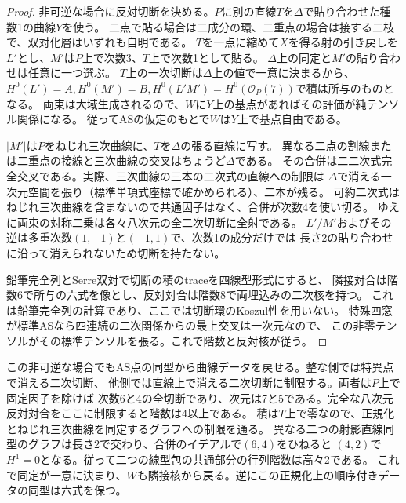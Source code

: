 \begin{proof}
非可逆な場合に反対切断を決める。$P$に別の直線$T$を$\Delta$で貼り合わせた種数1の曲線$Y$を使う。
二点で貼る場合は二成分の環、二重点の場合は接する二枝で、双対化層はいずれも自明である。
$T$を一点に縮めて$X$を得る射の引き戻しを$L'$とし、$M'$は$P$上で次数3、$T$上で次数1として貼る。
$\Delta$上の同定と$M'$の貼り合わせは任意に一つ選ぶ。
$T$上の一次切断は$\Delta$上の値で一意に決まるから、
$H^0(L')=A,H^0(M')=B,H^0(L'M')=H^0(\mathcal O_P(7))$で積は所与のものとなる。
両束は大域生成されるので、$W$に$Y$上の基点があればその評価が純テンソル関係になる。
従ってASの仮定のもとで$W$は$Y$上で基点自由である。

$|M'|$は$P$をねじれ三次曲線に、$T$を$\Delta$の張る直線に写す。
異なる二点の割線または二重点の接線と三次曲線の交叉はちょうど$\Delta$である。
その合併は二二次式完全交叉である。実際、三次曲線の三本の二次式の直線への制限は
$\Delta$で消える一次元空間を張り（標準単項式座標で確かめられる）、二本が残る。
可約二次式はねじれ三次曲線を含まないので共通因子はなく、合併が次数4を使い切る。
ゆえに両束の対称二乗は各々八次元の全二次切断に全射である。
$L'/M'$およびその逆は多重次数$(1,-1)$と$(-1,1)$で、次数1の成分だけでは
長さ2の貼り合わせに沿って消えられないため切断を持たない。

鉛筆完全列とSerre双対で切断の積のtraceを四線型形式にすると、
隣接対合は階数6で所与の六式を像とし、反対対合は階数8で両埋込みの二次核を持つ。
これは鉛筆完全列の計算であり、ここでは切断環のKoszul性を用いない。
特殊四窓が標準ASなら四連続の二次関係からの最上交叉は一次元なので、
この非零テンソルがその標準テンソルを張る。これで階数と反対核が従う。
\end{proof}

この非可逆な場合でもAS点の同型から曲線データを戻せる。整な側では特異点で消える二次切断、
他側では直線上で消える二次切断に制限する。両者は$P$上で固定因子を除けば
次数6と4の全切断であり、次元は7と5である。完全な八次元反対対合をここに制限すると階数は4以上である。
積は$T$上で零なので、正規化とねじれ三次曲線を同定するグラフへの制限を通る。
異なる二つの射影直線同型のグラフは長さ2で交わり、合併のイデアルで$(6,4)$をひねると
$(4,2)$で$H^1=0$となる。従って二つの線型包の共通部分の行列階数は高々2である。
これで同定が一意に決まり、$W$も隣接核から戻る。逆にこの正規化上の順序付きデータの同型は六式を保つ。

